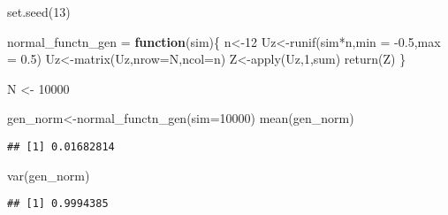 \documentclass[
]{article}
\newenvironment{Shaded}{\begin{snugshade}}{\end{snugshade}}
\newcommand{\AttributeTok}[1]{\textcolor[rgb]{0.77,0.63,0.00}{#1}}
\newcommand{\ControlFlowTok}[1]{\textcolor[rgb]{0.13,0.29,0.53}{\textbf{#1}}}
\newcommand{\DecValTok}[1]{\textcolor[rgb]{0.00,0.00,0.81}{#1}}
\newcommand{\FloatTok}[1]{\textcolor[rgb]{0.00,0.00,0.81}{#1}}
\newcommand{\FunctionTok}[1]{\textcolor[rgb]{0.00,0.00,0.00}{#1}}
\newcommand{\NormalTok}[1]{#1}
\newcommand{\OtherTok}[1]{\textcolor[rgb]{0.56,0.35,0.01}{#1}}
\newcommand{\SpecialCharTok}[1]{\textcolor[rgb]{0.00,0.00,0.00}{#1}}
\begin{document}
\begin{Shaded}
\begin{Highlighting}[]
\FunctionTok{set.seed}\NormalTok{(}\DecValTok{13}\NormalTok{)}



\NormalTok{normal\_functn\_gen }\OtherTok{=} \ControlFlowTok{function}\NormalTok{(sim)\{}
\NormalTok{  n}\OtherTok{\textless{}{-}}\DecValTok{12} 
\NormalTok{  Uz}\OtherTok{\textless{}{-}}\FunctionTok{runif}\NormalTok{(sim}\SpecialCharTok{*}\NormalTok{n,}\AttributeTok{min =} \SpecialCharTok{{-}}\FloatTok{0.5}\NormalTok{,}\AttributeTok{max =} \FloatTok{0.5}\NormalTok{) }
\NormalTok{  Uz}\OtherTok{\textless{}{-}}\FunctionTok{matrix}\NormalTok{(Uz,}\AttributeTok{nrow=}\NormalTok{N,}\AttributeTok{ncol=}\NormalTok{n) }
\NormalTok{  Z}\OtherTok{\textless{}{-}}\FunctionTok{apply}\NormalTok{(Uz,}\DecValTok{1}\NormalTok{,sum)}
  \FunctionTok{return}\NormalTok{(Z)}
\NormalTok{\}}

\NormalTok{N }\OtherTok{\textless{}{-}} \DecValTok{10000}

\NormalTok{gen\_norm}\OtherTok{\textless{}{-}}\FunctionTok{normal\_functn\_gen}\NormalTok{(}\AttributeTok{sim=}\DecValTok{10000}\NormalTok{)}
\FunctionTok{mean}\NormalTok{(gen\_norm)}
\end{Highlighting}
\end{Shaded}

\begin{verbatim}
## [1] 0.01682814
\end{verbatim}

\begin{Shaded}
\begin{Highlighting}[]
\FunctionTok{var}\NormalTok{(gen\_norm)}
\end{Highlighting}
\end{Shaded}

\begin{verbatim}
## [1] 0.9994385
\end{verbatim}
\end{document}
